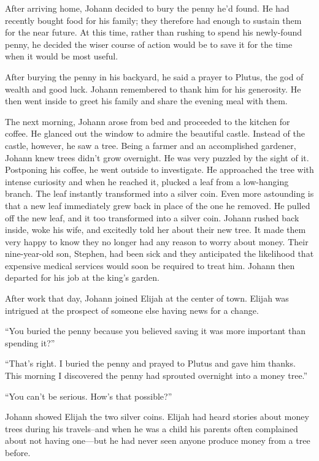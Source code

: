 After arriving home, Johann decided to bury the penny he'd found. He had recently bought food for his family; they therefore had enough to sustain them for the near future. At this time, rather than rushing to spend his newly-found penny, he decided the wiser course of action would be to save it for the time when it would be most useful.

After burying the penny in his backyard, he said a prayer to Plutus, the god of wealth and good luck. Johann remembered to thank him for his generosity. He then went inside to greet his family and share the evening meal with them.

The next morning, Johann arose from bed and proceeded to the kitchen for coffee. He glanced out the window to admire the beautiful castle. Instead of the castle, however, he saw a tree. Being a farmer and an accomplished gardener, Johann knew trees didn't grow overnight. He was very puzzled by the sight of it. Postponing his coffee, he went outside to investigate. He approached the tree with intense curiosity and when he reached it, plucked a leaf from a low-hanging branch. The leaf instantly transformed into a silver coin. Even more astounding is that a new leaf immediately grew back in place of the one he removed. He pulled off the new leaf, and it too transformed into a silver coin. Johann rushed back inside, woke his wife, and excitedly told her about their new tree. It made them very happy to know they no longer had any reason to worry about money. Their nine-year-old son, Stephen, had been sick and they anticipated the likelihood that expensive medical services would soon be required to treat him. Johann then departed for his job at the king's garden.

After work that day, Johann joined Elijah at the center of town. Elijah was intrigued at the prospect of someone else having news for a change.

“You buried the penny because you believed saving it was more important than spending it?”

“That's right. I buried the penny and prayed to Plutus and gave him thanks. This morning I discovered the penny had sprouted overnight into a money tree.”

“You can't be serious. How's that possible?”

Johann showed Elijah the two silver coins. Elijah had heard stories about money trees during his travels--and when he was a child his parents often complained about not having one—but he had never seen anyone produce money from a tree before.

